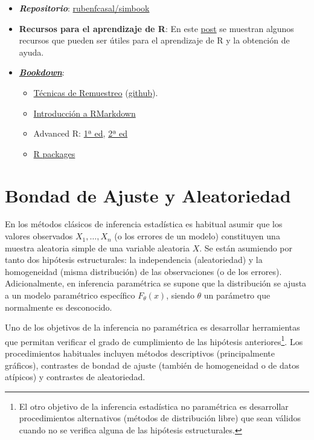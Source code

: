 \documentclass[
]{book}
\theoremstyle{break}
\theoremstyle{nonumberplain}
\begin{document}
\begin{itemize}
\item
  \textbf{\emph{Repositorio}}: \href{https://github.com/rubenfcasal/simbook}{rubenfcasal/simbook}
\item
  \textbf{Recursos para el aprendizaje de R}: En este \href{https://rubenfcasal.github.io/post/ayuda-y-recursos-para-el-aprendizaje-de-r}{post} se muestran algunos recursos que pueden ser útiles para el aprendizaje de R y la obtención de ayuda.
\item
  \href{https://bookdown.org}{\textbf{\emph{Bookdown}}}:

  \begin{itemize}
  \item
    \href{https://rubenfcasal.github.io/book_remuestreo}{Técnicas de Remuestreo}
    (\href{https://github.com/rubenfcasal/book_remuestreo}{github}).
  \item
    \href{https://rubenfcasal.github.io/bookdown_intro/rmarkdown.html}{Introducción a RMarkdown}
  \item
    Advanced R:
    \href{http://adv-r.had.co.nz/}{1ª ed},
    \href{https://adv-r.hadley.nz/}{2ª ed}
  \item
    \href{http://r-pkgs.had.co.nz/}{R packages}
  \end{itemize}
\end{itemize}

\hypertarget{gof-aleat}{%
\chapter{Bondad de Ajuste y Aleatoriedad}\label{gof-aleat}}

En los métodos clásicos de inferencia estadística es habitual asumir que los valores observados \(X_1,\ldots, X_n\) (o los errores de un modelo) constituyen una muestra aleatoria simple de una variable aleatoria \(X\).
Se están asumiendo por tanto dos hipótesis estructurales: la independencia (aleatoriedad) y la homogeneidad (misma distribución) de las observaciones (o de los errores).
Adicionalmente, en inferencia paramétrica se supone que la distribución se ajusta a un modelo
paramétrico específico \(F_{\theta}(x)\), siendo \(\theta\) un parámetro que normalmente es desconocido.

Uno de los objetivos de la inferencia no paramétrica es desarrollar herramientas que permitan verificar el grado de cumplimiento de las hipótesis anteriores\footnote{
  El otro objetivo de la inferencia estadística no paramétrica es desarrollar procedimientos alternativos (métodos de distribución libre) que sean válidos cuando no se verifica alguna de las hipótesis estructurales.}.
Los procedimientos habituales incluyen métodos descriptivos (principalmente gráficos), contrastes de bondad de ajuste (también de homogeneidad o de datos atípicos) y contrastes de aleatoriedad.
\end{document}
